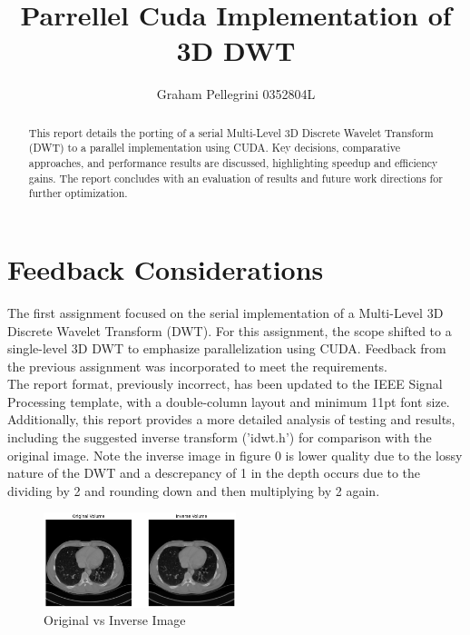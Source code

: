\documentclass[journal,11pt]{IEEEtran}
\begin{document}
\title{Parrellel Cuda Implementation of 3D DWT}
\author{Graham Pellegrini 0352804L}


\maketitle

\begin{abstract}
    This report details the porting of a serial Multi-Level 3D Discrete Wavelet Transform (DWT) to a parallel implementation using CUDA. Key decisions, comparative approaches, and performance results are discussed, highlighting speedup and efficiency gains. The report concludes with an evaluation of results and future work directions for further optimization.
\end{abstract}
    

\section{Feedback Considerations}

The first assignment focused on the serial implementation of a Multi-Level 3D Discrete Wavelet Transform (DWT). For this assignment, the scope shifted to a single-level 3D DWT to emphasize parallelization using CUDA. Feedback from the previous assignment was incorporated to meet the requirements.\\

The report format, previously incorrect, has been updated to the IEEE Signal Processing template, with a double-column layout and minimum 11pt font size. Additionally, this report provides a more detailed analysis of testing and results, including the suggested inverse transform ('idwt.h') for comparison with the original image. Note the inverse image in figure 0 is lower quality due to the lossy nature of the DWT and a descrepancy of 1 in the depth occurs due to the dividing by 2 and rounding down and then multiplying by 2 again.\\

\begin{figure}[h]
    \centering
    \includegraphics[width=0.5\textwidth]{assets/inverse.png}
    \caption{Original vs Inverse Image}
    \label{fig:1}
\end{figure}
\end{document}
